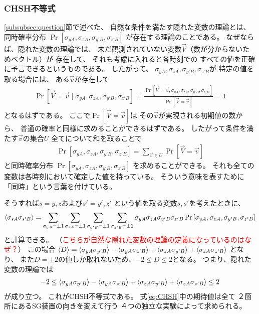 \documentclass[a4paper, 10pt]{jsarticle}
\begin{document}
\subsubsection{CHSH不等式}
\ref{subsubsec:question}節で述べた、
自然な条件を満たす隠れた変数の理論とは、
同時確率分布
$\Pr \left[ \sigma_{yA}, \sigma_{zA},
\sigma_{y'B}, \sigma_{z'B} \right]$
が存在する理論のことである。
なぜならば、隠れた変数の理論では、
未だ観測されていない変数$\vec{V}$（数が分からないためベクトル）が
存在して、
それも考慮に入れると各時刻での
すべての値を正確に予言できるというものである。
したがって、
$\sigma_{yA}, \sigma_{zA},\sigma_{y'B}, \sigma_{z'B}$が
特定の値を取る場合には、
ある$\vec{v}$が存在して
\begin{align}
	\Pr \left[ \vec{V} = \vec{v} \mid
	\sigma_{yA}, \sigma_{zA}, \sigma_{y'B}, \sigma_{z'B} \right]
	= \frac{\Pr \left[ \vec{V} = \vec{v},
	\sigma_{yA}, \sigma_{zA}, \sigma_{y'B}, \sigma_{z'B} \right]}
	{\Pr \left[ \vec{V} = \vec{v} \right]}
	= 1
	\label{eq:全確率}
\end{align}
となるはずである。
ここで$\Pr \left[ \vec{V} = \vec{v} \right]$は
その$\vec{v}$が実現される初期値の数から、
普通の確率と同様に求めることができるはずである。
したがって条件を満たす$\vec{v}$の集合$U$
全てについて和を取ることで
\begin{align}
	\Pr \left[ \sigma_{yA}, \sigma_{zA},
	\sigma_{y'B}, \sigma_{z'B} \right]
	= \sum_{\vec{v} \in U} \Pr \left[ \vec{V} = \vec{v} \right]
\end{align}
と同時確率分布
$\Pr \left[ \sigma_{yA}, \sigma_{zA},
\sigma_{y'B}, \sigma_{z'B} \right]$
を求めることができる。
それも全ての変数は各時刻において確定した値を持っている。
そういう意味を表すために「同時」という言葉を付けている。

そうすれば$s = y,z$および$s' = y', z'$
という値を取る変数$s, s'$を考えたときに、
\begin{align}
	\Braket{\sigma_{sA} \sigma_{s'B}}
	= \sum_{\sigma_{yA} = \pm 1} \sum_{\sigma_{zA} = \pm 1}
	\sum_{\sigma_{y'B} = \pm 1} \sum_{\sigma_{z'B} = \pm 1}
	\sigma_{yA} \sigma_{zA} \sigma_{y'B} \sigma_{z'B}
	\Pr \left[ \sigma_{yA}, \sigma_{zA},
	\sigma_{y'B}, \sigma_{z'B} \right]
\end{align}
と計算できる。
（\textcolor{red}
{こちらが自然な隠れた変数の理論の定義になっているのはなぜ？}）
この場合
$\Braket{D} = \Braket{\sigma_{yA} \sigma_{y'B}}
- \Braket{\sigma_{yA} \sigma_{z'B}}
+ \Braket{\sigma_{zA} \sigma_{y'B}}
+ \Braket{\sigma_{zA} \sigma_{z'B}}$
となり、
また$D = \pm 2$の値しか取れないため、$-2 \leq D \leq 2$となる。
つまり、隠れた変数の理論では
\begin{align}
	-2 \leq
	\Braket{\sigma_{yA} \sigma_{y'B}}
	- \Braket{\sigma_{yA} \sigma_{z'B}}
	+ \Braket{\sigma_{zA} \sigma_{y'B}}
	+ \Braket{\sigma_{zA} \sigma_{z'B}}
	\leq 2
	\label{eq:CHSH}
\end{align}
が成り立つ。
これがCHSH不等式である。
式\eqref{eq:CHSH}中の期待値は全て
２箇所にあるSG装置の向きを変えて行う
４つの独立な実験によって求められる。
\end{document}
